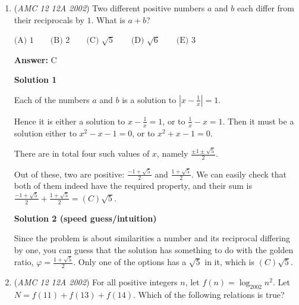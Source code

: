 \begin{enumerate}
 



\textbf{Solution 3}

By Vieta's you have 
 \[a+b=63\]
 \[ab=k\]Since we know odd + even = odd, we must have either $a$ or $b$ equal to $2$ and the other equal to $63-2=61.$ Both of these are prime so they satisfy the restraints. Thus there is $\boxed{(B) 1}$ solution.

 \textbf{Note} All these solutions are principled in \href{https://artofproblemsolving.com/wiki/index.php?title=Vieta\%27s\_Formulas}{Vieta's Formulas}, and can be viewed as identical.

 \textbf{Note} The solution in this video may be similar to others.

 


	\item (\textit{AMC 12 12A 2002}) Two different positive numbers $a$ and $b$ each differ from their reciprocals by $1$. What is $a+b$?


 $\text{(A) }1 \qquad \text{(B) }2 \qquad \text{(C) }\sqrt 5 \qquad \text{(D) }\sqrt 6 \qquad \text{(E) }3$

 \textbf{Answer: }C



\textbf{Solution 1}

Each of the numbers $a$ and $b$ is a solution to $\left| x - \frac 1x \right| = 1$.

 Hence it is either a solution to $x - \frac 1x = 1$, or to $\frac 1x - x = 1$. Then it must be a solution either to $x^2 - x - 1 = 0$, or to $x^2 + x - 1 = 0$.

 There are in total four such values of $x$, namely $\frac{\pm 1 \pm \sqrt 5}2$. 

 Out of these, two are positive: $\frac{-1+\sqrt 5}2$ and $\frac{1+\sqrt 5}2$. We can easily check that both of them indeed have the required property, and their sum is $\frac{-1+\sqrt 5}2 + \frac{1+\sqrt 5}2 = \boxed{(C) \sqrt 5}$.

 



\textbf{Solution 2 (speed guess/intuition)}

Since the problem is about similarities a number and its reciprocal differing by one, you can guess that the solution has something to do with the golden ratio, $\varphi = \frac{1+\sqrt 5}2$. Only one of the options has a $\sqrt{5}$ in it, which is $\boxed{(C) \sqrt 5}$.

 


	\item (\textit{AMC 12 12A 2002}) For all positive integers $n$, let $f(n)=\log_{2002} n^2$. Let $N=f(11)+f(13)+f(14)$. Which of the following relations is true?



\end{enumerate}
